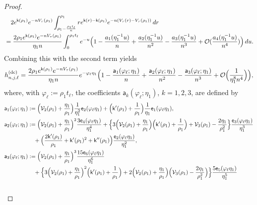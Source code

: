 \documentclass[a4paper]{article}
\numberwithin{equation}{section}
\begin{document}
\begin{proof}
\begin{align*}
&\quad 2e^{\mathsf{k}(\rho_1)}e^{-nV_{\tau}(\rho_1)}\int_{\rho_1-\frac{\rho_1t_{\ell}}{n}}^{\rho_1}re^{\mathsf{k}(r)-\mathsf{k}(\rho_1)}e^{-n(V_{\tau}(r)-V_{\tau}(\rho_1))}\,dr
\\
&=
\frac{2\rho_1e^{\mathsf{k}(\rho_1)}e^{-nV_{\tau}(\rho_1)}}{\eta_1 n}\int_0^{\rho_1t_{\ell}}
e^{-u}
\Bigl(1-\frac{a_1(\eta_1^{-1}u)}{n}+\frac{a_2(\eta_1^{-1}u)}{n^2}-\frac{a_3(\eta_1^{-1}u)}{n^3}+\mathcal{O}(\frac{a_4(\eta_1^{-1}u)}{n^4})\Bigr)
\,du.
\end{align*}
Combining this with the second term yields
\[
h_{n,j,\ell}^{(\mathrm{dc})}
=\frac{2\rho_1e^{\mathsf{k}(\rho_1)}e^{-nV_{\tau}(\rho_1)}}{\eta_1 n}
e^{-\varphi_{\ell}\eta_1}
\Bigl( 
1
-\frac{\mathsf{a}_1(\varphi_{\ell};\eta_1)}{n}
+\frac{\mathsf{a}_2(\varphi_{\ell};\eta_1)}{n^2}
-\frac{\mathsf{a}_3(\varphi_{\ell};\eta_1)}{n^3}
+\mathcal{O}\Bigl(\frac{1}{\eta_1^{8}n^{4}}\Bigr)
\Bigr),
\]
where, with $\varphi_{\ell}:=\rho_1t_{\ell}$, the coefficients $\mathsf{a}_k(\varphi_{\ell};\eta_1)$, $k=1,2,3$, are defined by 
\begin{align*}
\mathsf{a}_1(\varphi_{\ell};\eta_1)&:=
\Bigl(\mathcal{V}_2(\rho_1)+\frac{\eta_1}{\rho_1}\Bigr)\frac{1}{\eta_1^2}\mathsf{e}_2(\varphi_{\ell}\eta_1)+\Bigl(\mathsf{k}'(\rho_1)+\frac{1}{\rho_1}\Bigr)\frac{1}{\eta_1}\mathsf{e}_1(\varphi_{\ell}\eta_1),
\\
\mathsf{a}_2(\varphi_{\ell};\eta_1)&:=
\Bigl(\mathcal{V}_2(\rho_1)+\frac{\eta_1}{\rho_1}\Bigr)^2
\frac{3\mathsf{e}_4(\varphi_{\ell}\eta_1)}{\eta_1^4}
+
\Bigl\{
3\Bigl(\mathcal{V}_2(\rho_1)+\frac{\eta_1}{\rho_1}\Bigr)
\Bigl(\mathsf{k}'(\rho_1)+\frac{1}{\rho_1}\Bigr)
+\mathcal{V}_3(\rho_1)-\frac{2\eta_1}{\rho_1^2}
\Bigr\}
\frac{\mathsf{e}_3(\varphi_{\ell}\eta_1)}{\eta_1^3}
\\
&\quad 
+\Bigl(\frac{2\mathsf{k}'(\rho_1)}{\rho_1}+\mathsf{k}'(\rho_1)^2+\mathsf{k}''(\rho_1)\Bigr)
\frac{\mathsf{e}_2(\varphi_{\ell}\eta_1)}{\eta_1^2}, 
\\
\mathsf{a}_3(\varphi_{\ell};\eta_1)&:=
\Bigl(\mathcal{V}_2(\rho_1)+\frac{\eta_1}{\rho_1}\Bigr)^3
\frac{15\mathsf{e}_6(\varphi_{\ell}\eta_1)}{\eta_1^6}
\\
&\quad 
+
\Bigl\{
3\Bigl(\mathcal{V}_2(\rho_1)+\frac{\eta_1}{\rho_1}\Bigr)^2\Bigl(\mathsf{k}'(\rho_1)+\frac{1}{\rho_1}\Bigr)
+
2\Bigl(\mathcal{V}_2(\rho_1)+\frac{\eta_1}{\rho_1}\Bigr)\Bigl(\mathcal{V}_3(\rho_1)-\frac{2\eta_1}{\rho_1^2}\Bigr)
\Bigr\}\frac{5\mathsf{e}_5(\varphi_{\ell}\eta_1)}{\eta_1^5}
\\
&\quad 

\end{align*}
\end{proof}
\end{document}

